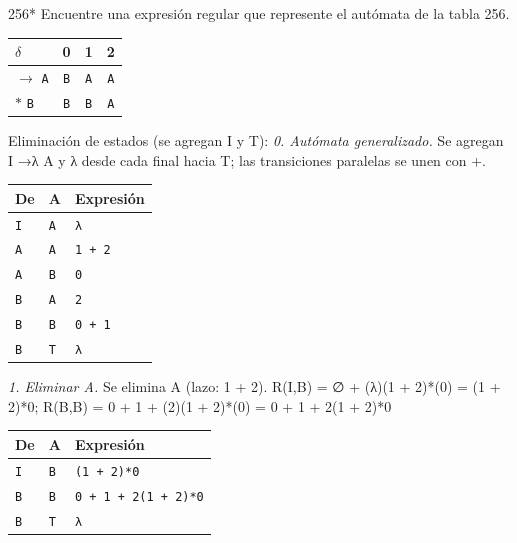 \documentclass[11pt]{article}
\begin{document}
\begin{ejercicio}{256}{*}
Encuentre una expresión regular que represente el autómata de la tabla 256.
\end{ejercicio}
\proc \begin{center}\small\begin{tabular}{lccc}\toprule
$\delta$ & 0 & 1 & 2 \\\midrule
$\to$ \texttt{A} & \texttt{B} & \texttt{A} & \texttt{A} \\
$*$ \texttt{B} & \texttt{B} & \texttt{B} & \texttt{A} \\
\bottomrule\end{tabular}\end{center}
Eliminación de estados (se agregan I y T):
\textit{0. Autómata generalizado.} Se agregan I →λ A y λ desde cada final hacia T; las transiciones paralelas se unen con +.
\begin{center}\footnotesize\begin{tabular}{lll}\toprule
De & A & Expresión \\\midrule
\texttt{I} & \texttt{A} & \texttt{λ} \\
\texttt{A} & \texttt{A} & \texttt{1 + 2} \\
\texttt{A} & \texttt{B} & \texttt{0} \\
\texttt{B} & \texttt{A} & \texttt{2} \\
\texttt{B} & \texttt{B} & \texttt{0 + 1} \\
\texttt{B} & \texttt{T} & \texttt{λ} \\
\bottomrule\end{tabular}\end{center}
\textit{1. Eliminar A.} Se elimina A (lazo: 1 + 2). R(I,B) = ∅ + (λ)(1 + 2)*(0) = (1 + 2)*0; R(B,B) = 0 + 1 + (2)(1 + 2)*(0) = 0 + 1 + 2(1 + 2)*0
\begin{center}\footnotesize\begin{tabular}{lll}\toprule
De & A & Expresión \\\midrule
\texttt{I} & \texttt{B} & \texttt{(1 + 2)*0} \\
\texttt{B} & \texttt{B} & \texttt{0 + 1 + 2(1 + 2)*0} \\
\texttt{B} & \texttt{T} & \texttt{λ} \\
\bottomrule\end{tabular}\end{center}
\end{document}
